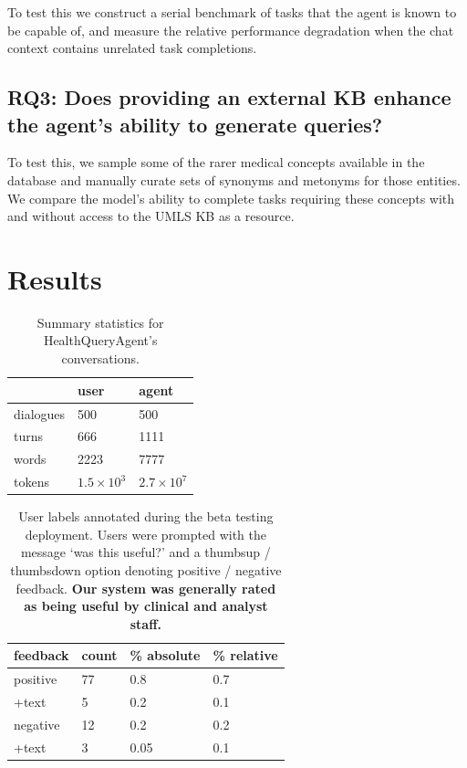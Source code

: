 \documentclass[11pt]{article}
\begin{document}
To test this we construct a serial benchmark of tasks that the agent is known to be capable of, and measure the relative performance degradation when the chat context contains unrelated task completions.

\subsection*{RQ3: Does providing an external KB enhance the agent's ability to generate queries?}

To test this, we sample some of the rarer medical concepts available in the database and manually curate sets of synonyms and metonyms for those entities.
We compare the model's ability to complete tasks requiring these concepts with and without access to the UMLS KB as a resource.

\section{Results}

\begin{table}[ht]
\centering
\begin{tabular}{|l|l|l|}
\hline
	& user & agent \\
\hline
	dialogues	& 500 & 500   \\
	turns		& 666 & 1111  \\
	words 		& 2223 & 7777 \\
	tokens		& $1.5 \times 10^3$ & $2.7 \times 10^7$ \\
\hline
\end{tabular}
\caption{Summary statistics for HealthQueryAgent's conversations.}
\label{tab:conversation-statistics}
\end{table}

\begin{table}[ht]
\centering
\begin{tabular}{|l|l|l|l|}
\hline
	feedback	& count & \% absolute	& \% relative \\	
\hline
	positive 	& 77	& 0.8		& 0.7	\\
\hspace{0.5cm} +text 	& 5	& 0.2		& 0.1 \\
\hline
	negative 	& 12 	& 0.2 		& 0.2 \\
\hspace{0.5cm} +text	& 3	& 0.05		& 0.1	\\
\hline	
\end{tabular}
\caption{
	User labels annotated during the beta testing deployment.
	Users were prompted with the message `was this useful?' and a thumbsup / thumbsdown option denoting positive / negative feedback.
	\textbf{Our system was generally rated as being useful by clinical and analyst staff.}	
}
\label{tab:user-feedback}
\end{table}
\end{document}
